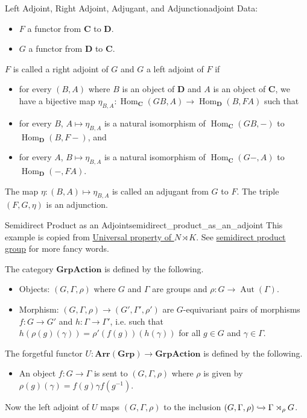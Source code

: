 \documentclass{article}
\begin{document}
\begin{definition}{Left Adjoint, Right Adjoint, Adjugant, and Adjunction}{adjoint}
    Data:
    \begin{itemize}
        \item $F$ a functor from $\mathbf{C}$ to $\mathbf{D}$.
        \item $G$ a functor from $\mathbf{D}$ to $\mathbf{C}$.
    \end{itemize}
    $F$ is called a right adjoint of $G$ and $G$ a left adjoint of $F$ if
    \begin{itemize}
        \item for every $(B,A)$ where $B$ is an object of $\mathbf{D}$ and $A$ is an object of $\mathbf{C}$,
        we have a bijective map $\eta_{B,A}: \operatorname{Hom}_{\mathbf{C}}(GB,A) \rightarrow \operatorname{Hom}_{\mathbf{D}}(B,FA)$ such that
        \item for every $B$, $A \mapsto \eta_{B,A}$ is a natural isomorphism of $\operatorname{Hom}_{\mathbf{C}}(GB, -)$ to $\operatorname{Hom}_{\mathbf{D}}(B, F-)$, and
        \item for every $A$, $B \mapsto \eta_{B,A}$ is a natural isomorphism of $\operatorname{Hom}_{\mathbf{C}}(G-, A)$ to $\operatorname{Hom}_{\mathbf{D}}(-, FA)$.
    \end{itemize}
    The map $\eta: (B,A) \mapsto \eta_{B,A}$ is called an adjugant from $G$ to $F$.
    The triple $(F,G,\eta)$ is an adjunction.
\end{definition}

\begin{example}{Semidirect Product as an Adjoint}{semidirect_product_as_an_adjoint}
    This example is copied from \href{https://math.stackexchange.com/questions/284315/universal-property-of-n-rtimes-k}{Universal property of $N\rtimes K$}.
    See \href{https://ncatlab.org/nlab/show/semidirect+product+group#as_a_left_adjoint}{semidirect product group} for more fancy words.
    \par
    The category $\mathbf{GrpAction}$ is defined by the following.
    \begin{itemize}
        \item Objects: $(G, \Gamma, \rho)$ where $G$ and $\Gamma$ are groups and $\rho: G\rightarrow \operatorname{Aut}(\Gamma)$.
        \item Morphism: $(G,\Gamma,\rho) \rightarrow (G',\Gamma',\rho')$ are $G$-equivariant pairs of morphisms $f: G\rightarrow G'$ and $h: \Gamma\rightarrow \Gamma'$,
        i.e. such that $h(\rho(g)(\gamma)) = \rho'(f(g))(h(\gamma))$ for all $g\in G$ and $\gamma\in \Gamma$.
    \end{itemize}
    The forgetful functor $U: \mathbf{Arr}(\mathbf{Grp}) \rightarrow \mathbf{GrpAction}$ is defined by the following.
    \begin{itemize}
        \item An object $f: G\rightarrow \Gamma$ is sent to $(G,\Gamma,\rho)$ where $\rho$ is given by $\rho(g)(\gamma) = f(g)\gamma f(g^{-1})$.
    \end{itemize}
    Now the left adjoint of $U$ maps $(G,\Gamma,\rho)$ to the inclusion $(G,\Gamma,\rho)\xhookrightarrow{} \Gamma \rtimes_\rho G$.
\end{example}
\end{document}
